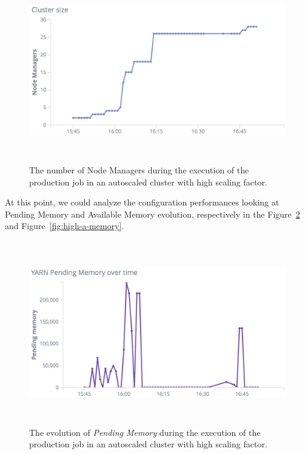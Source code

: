 \documentclass[12pt,twoside,cucitura]{toptesi}
\begin{document}
\begin{figure}
\centering
\includegraphics[height=80mm]{high-size}
\caption{The number of Node Managers during the execution of the production job in an autoscaled cluster with high scaling factor.}\label{fig:high-size}
\end{figure}

At this point, we could analyze the configuration performances looking at Pending Memory and Available Memory evolution, respectively in the Figure~\ref{fig:high-p-memory} and Figure~\ref{fig:high-a-memory}.

\begin{figure}
\centering
\includegraphics[height=80mm]{high-p-memory}
\caption{The evolution of \textit{Pending Memory} during the execution of the production job in an autoscaled cluster with high scaling factor.}\label{fig:high-p-memory}
\end{figure}
\end{document}
